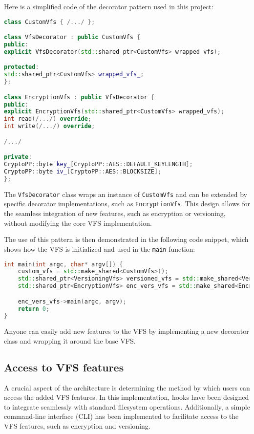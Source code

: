 Here is a simplified code of the decorator pattern used in this project:

\begin{lstlisting}[language=c++, basicstyle=\ttfamily\small]
class CustomVfs { /.../ };

class VfsDecorator : public CustomVfs {
public:
explicit VfsDecorator(std::shared_ptr<CustomVfs> wrapped_vfs);

protected:
std::shared_ptr<CustomVfs> wrapped_vfs_;
};

class EncryptionVfs : public VfsDecorator {
public:
explicit EncryptionVfs(std::shared_ptr<CustomVfs> wrapped_vfs);
int read(/.../) override;
int write(/.../) override;

/.../

private:
CryptoPP::byte key_[CryptoPP::AES::DEFAULT_KEYLENGTH];
CryptoPP::byte iv_[CryptoPP::AES::BLOCKSIZE];
};
\end{lstlisting}

The \texttt{VfsDecorator} class wraps an instance of \texttt{CustomVfs} and can be extended by specific decorator implementations, such as \texttt{EncryptionVfs}.
This design allows for the seamless integration of new features, such as encryption or versioning, without modifying the core VFS implementation.

The use of this pattern is then demonstrated in the following code snippet, which shows how the VFS is initialized and used in the \texttt{main} function:

\begin{lstlisting}[language=c++, basicstyle=\ttfamily\small]
int main(int argc, char* argv[]) {
    custom_vfs = std::make_shared<CustomVfs>();
    std::shared_ptr<VersioningVfs> versioned_vfs = std::make_shared<VersioningVfs>(custom_vfs);
    std::shared_ptr<EncryptionVfs> enc_vers_vfs = std::make_shared<EncryptionVfs>(versioned_vfs);

    enc_vers_vfs->main(argc, argv);
    return 0;
}
\end{lstlisting}

Anyone can easily add new features to the VFS by implementing a new decorator class and wrapping it around the base VFS\@.

\subsection{Access to VFS features}\label{subsec:access-to-vfs-features}

A crucial aspect of the architecture is determining the method by which users can access the added VFS features.
In this implementation, hooks have been designed to integrate seamlessly with standard filesystem operations.
Additionally, a simple command-line interface (CLI) has been implemented to facilitate access to the VFS features, such as encryption and versioning.

